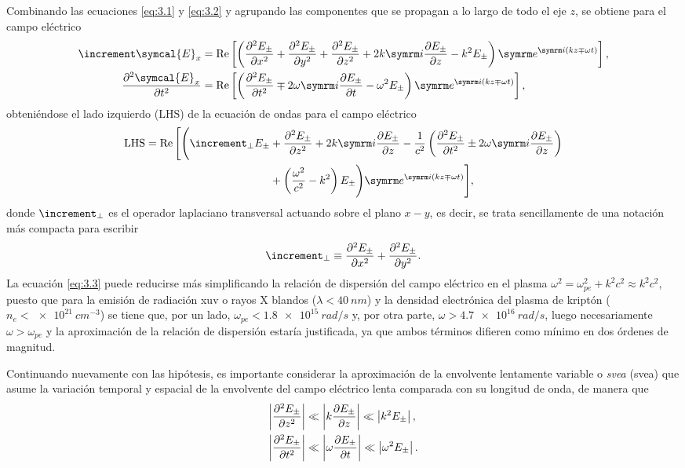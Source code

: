 Combinando las ecuaciones \eqref{eq:3.1} y \eqref{eq:3.2} y agrupando las componentes que se propagan a lo largo de todo el eje $z$, se obtiene para el campo eléctrico
\begin{align}
  \laplacian \symcal{E}_{x} 
  &= 
  \RE \left[\left(\pdvN{E_{\pm }}{x}{2} + \pdvN{E_{\pm }}{y}{2} + \pdvN{E_{\pm }}{z}{2} + 2k \iu \pdv{E_{\pm }}{z} - k^{2}E_{\pm }\right)\eu^{\iu (kz \mp \omega t)}\right], \\
  \pdvN{\symcal{E}_{x}}{t}{2}
  &= 
  \RE \left[\left(\pdvN{E_{\pm }}{t}{2} \mp 2 \omega \iu \pdv{E_{\pm }}{t} - \omega^{2}E_{\pm }\right)\eu^{\iu (kz \mp \omega t)}\right],
\end{align}
\noindent
obteniéndose el lado izquierdo ($\mathrm{LHS}$) de la ecuación de ondas para el campo eléctrico
\begin{equation}\label{eq:3.3}
  \begin{split}
    \mathrm{LHS} = \RE \Bigg[\Bigg(\laplacian_{\perp}E_{\pm} &+ \pdvN{E_{\pm }}{z}{2} + 2k \iu \pdv{E_{\pm }}{z} - \frac{1}{c^{2}}\left(\pdvN{E_{\pm }}{t}{2} \pm 2 \omega \iu \pdv{E_{\pm }}{z}\right) \\ &+  \left(\frac{\omega^{2}}{c^{2}} - k^{2}\right)E_{\pm }\Bigg)\eu^{\iu(kz \mp \omega t)}\Bigg],
  \end{split}
\end{equation}
\noindent
donde $\laplacian_{\perp}$ es el operador laplaciano transversal actuando sobre el plano $x-y$, es decir, se trata sencillamente de una notación más compacta para escribir 
\begin{equation*}
    \laplacian_{\perp} \equiv \pdvN{E_{\pm }}{x}{2} + \pdvN{E_{\pm }}{y}{2}.
\end{equation*}
La ecuación \eqref{eq:3.3} puede reducirse más simplificando la relación de dispersión del campo eléctrico en el plasma $\omega^{2} = \omega^{2}_{pe} + k^{2}c^{2}\approx k^{2}c^{2}$, puesto que para la emisión de radiación \acrshort{xuv} o rayos X blandos ($\lambda<\qty{40}{nm}$) y la densidad electrónica del plasma de kriptón ($n_e<\qty{e21}{cm^{-3}}$) se tiene que, por un lado, $\omega_{pe}<\qty{1,8e15}{rad/s}$ y, por otra parte, $\omega>\qty{4,7e16}{rad/s}$, luego necesariamente $\omega>\omega_{pe}$ y la aproximación de la relación de dispersión estaría justificada, ya que ambos términos difieren como mínimo en dos órdenes de magnitud. 

Continuando nuevamente con las hipótesis, es importante considerar la aproximación de la envolvente lentamente variable o \emph{\acrlong{svea}} (\acrshort{svea}) que asume la variación temporal y espacial de la envolvente del campo eléctrico lenta\autocite{Larroche2000} comparada con su longitud de onda, de manera que
\begin{align}
  \left|\frac{\partial^{2}E_{\pm }}{\partial{z}^{2}}\right| &\ll \left|k \frac{\partial E_{\pm }}{\partial z}\right| \ll \left|k^{2}E_{\pm }\right|,\\
  \left|\frac{\partial^{2}E_{\pm }}{\partial{t}^{2}}\right| &\ll \left|\omega \frac{\partial E_{\pm }}{\partial t}\right| \ll \left|\omega^{2}E_{\pm }\right|.
\end{align}


